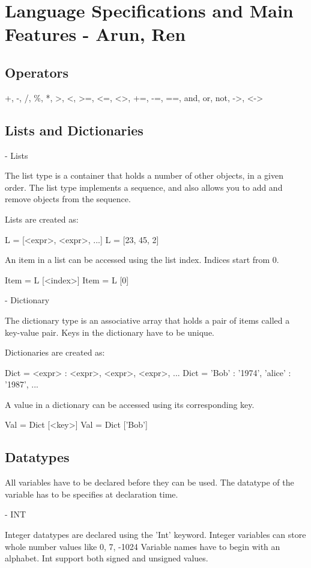 \section{Language Specifications and Main Features - Arun, Ren}
\label{sect:spec}

\subsection{Operators}
+, -, /, \%, *, >, <, >=, <=, <>, +=, -=, ==, and, or, not, ->, <->

\subsection{Lists and Dictionaries}

- Lists

The list type is a container that holds a number of other objects, in a given order.
The list type implements a sequence, and also allows you to add and remove objects from the sequence.

Lists are created as:

L = [<expr>, <expr>, ...]
L = [23, 45, 2]

An item in a list can be accessed using the list index. Indices start from 0.

Item = L [<index>]
Item = L [0]



- Dictionary

The dictionary type is an associative array that holds a pair of items called a key-value pair.
Keys in the dictionary have to be unique.

Dictionaries are created as:

Dict = {<expr> : <expr>, <expr>, <expr>, ...}
Dict = { 'Bob' : '1974', 'alice' : '1987', ...}

A value in a dictionary can be accessed using its corresponding key.

Val = Dict [<key>]
Val = Dict ['Bob']




\subsection{Datatypes}

All variables have to be declared before they can be used. The datatype of the variable has to be specifies at declaration time.


- INT

Integer datatypes are declared using the 'Int' keyword. Integer variables can store whole number values like 0, 7, -1024
Variable names have to begin with an alphabet. Int support both signed and unsigned values.

